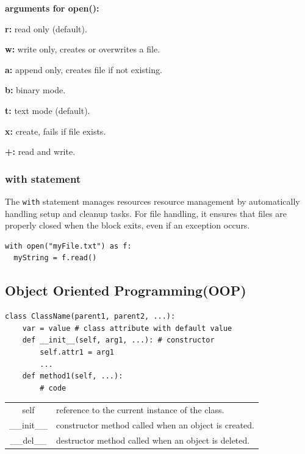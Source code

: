 \documentclass[5pt]{article}
\begin{document}
\begin{multicols}{2}
\textbf{arguments for open():}
\begin{itemize*}
    \item \textbf{r:} read only (default).
    \item \textbf{w:} write only, creates or overwrites a file.
    \item \textbf{a:} append only, creates file if not existing.
    \item \textbf{b:} binary mode.
    \item \textbf{t:} text mode (default).
    \item \textbf{x:} create, fails if file exists.
    \item \textbf{+:} read and write.
\end{itemize*}

\subsubsection{with statement}
The \texttt{with} statement manages resources  resource management by automatically handling setup and cleanup tasks.
For file handling, it ensures that files are properly closed when the block exits, even if an exception occurs.
\begin{verbatim}
with open("myFile.txt") as f:
  myString = f.read()
\end{verbatim}

\subsection{Object Oriented Programming(OOP)}
\begin{verbatim}
class ClassName(parent1, parent2, ...):
    var = value # class attribute with default value
    def __init__(self, arg1, ...): # constructor
        self.attr1 = arg1
        ...
    def method1(self, ...):
        # code
\end{verbatim}
\begin{tabular}{C L}
    self        & reference to the current instance of the class.\\
    \_\_init\_\_  & constructor method called when an object is created.\\
    \_\_del\_\_ & destructor method called when an object is deleted.\\
\end{tabular}

\end{multicols}
\end{document}
